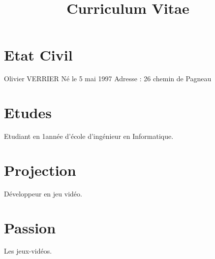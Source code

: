 \documentclass{article}
\title{Curriculum Vitae}
\begin{document}
\maketitle

\section{Etat Civil}
Olivier VERRIER\newline
Né le 5 mai 1997\newline
Adresse : 26 chemin de Pagneau\newline

\section{Etudes}
Etudiant en 1\ier année d'école d'ingénieur en Informatique.

\section{Projection}
Développeur en jeu vidéo.

\section{Passion}
Les jeux-vidéos.
\end{document}
